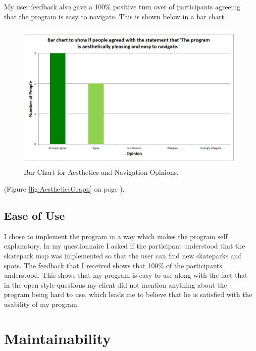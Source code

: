 My user feedback also gave a 100\% positive turn over of participants agreeing that the program is easy to navigate. This is shown below in a bar chart.

\begin{figure}[H]
    \includegraphics[width=\textwidth]{./Evaluation/images/AestheticsGraph.pdf}
    \caption{Bar Chart for Aesthetics and Navigation Opinions.} \label{fig:AestheticsGraphCopy}
\end{figure}

(Figure \ref{fig:AestheticsGraph} on page \pageref{fig:AestheticsGraph}).

	\subsection{Ease of Use}

I chose to implement the program in a way which makes the program self explanatory. In my questionnaire I asked if the participant understood that the skatepark map was implemented so that the user can find new skateparks and spots. The feedback that I received shows that 100\% of the participants understood. This shows that my program is easy to use along with the fact that in the open style questions my client did not mention anything about the program being hard to use, which leads me to believe that he is satisfied with the usability of my program.








\section{Maintainability} %

